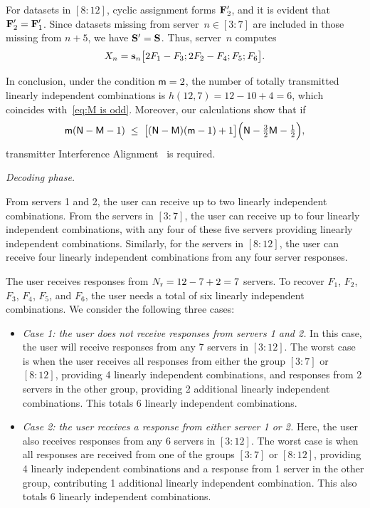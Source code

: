 \documentclass[conference,letterpaper]{IEEEtran}
\begin{document}
\begin{example}
For datasets in \([8{:}12]\), cyclic assignment forms \({\bf F}'_2\), and it is evident that \({\bf F}'_2 = {\bf F}'_1\). Since datasets missing from server~\(n \in [3{:}7]\) are included in those missing from \(n+5\), we have \({\bf S}' = {\bf S}\). Thus, server~\(n\) computes
\[
X_n = {\bf s}_n \bigl[2F_1 - F_3; 2F_2 - F_4; F_5; F_6\bigr].
\]
 


In conclusion, under the condition ${\sf m} = 2$, the number of totally transmitted linearly independent combinations is $h(12,7) = 12 - 10 + 4 = 6$, which coincides with~\eqref{eq:M is odd}. Moreover, our calculations show that if
\[
{\sf m}({\sf N} - {\sf M} - 1) \;\leq\; \bigl[({\sf N} - {\sf M})({\sf m} - 1) + 1\bigr]\Bigl({\sf N} - \tfrac{3}{2}{\sf M} - \tfrac{1}{2}\Bigr),
\]
transmitter Interference Alignment~\cite{2008Interference_Alignment, MIMO_interference_channel, huang2023ISITversion} is required.
  



\iffalse
{\it Decoding phase.}

From servers 1 and 2, the user can receive up to two linearly independent combinations. From the servers in $[3:7]$, the user can receive up to four linearly independent combinations, with any four of these five servers providing linearly independent combinations. Similarly, for the servers in $[8:12]$, the user can receive four linearly independent combinations from any four server responses.

The user receives responses from $N_{\rm r} = 12 - 7 + 2 = 7$ servers.
To recover $F_1$, $F_2$, $F_3$, $F_4$, $F_5$, and $F_6$, the user needs a total of six linearly independent combinations. We consider the following three cases:
\begin{itemize}
\item {\it Case 1: the user does not receive responses from servers 1 and 2.} In this case, the user will receive responses from any 7 servers in $[3:12]$. The worst case is when the user receives all responses from either the group $[3:7]$ or $[8:12]$, providing 4 linearly independent combinations, and responses from 2 servers in the other group, providing 2 additional linearly independent combinations. This totals 6 linearly independent combinations.

\item {\it Case 2: the user receives a response from either server 1 or 2.} Here, the user also receives responses from any 6 servers in $[3:12]$. The worst case is when all responses are received from one of the groups $[3:7]$ or $[8:12]$, providing 4 linearly independent combinations and a response from 1 server in the other group, contributing 1 additional linearly independent combination. This also totals 6 linearly independent combinations.


\end{itemize}
\end{example}
\end{document}
